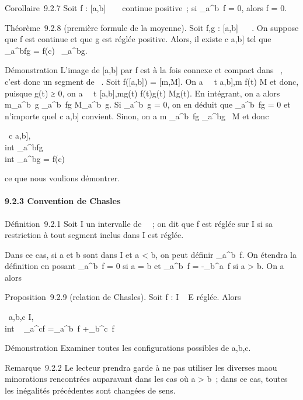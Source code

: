 \documentclass[]{article}
\begin{document}
Corollaire~9.2.7 Soit f : {[}a,b{]} \rightarrow~ ~ continue positive~; si
\int  \_a^b~f = 0, alors f = 0.

Théorème~9.2.8 (première formule de la moyenne). Soit f,g : {[}a,b{]} \rightarrow~
~. On suppose que f est continue et que g est réglée positive. Alors, il
existe c \in {[}a,b{]} tel que \int ~
\_a^bfg = f(c)\int ~
\_a^bg.

Démonstration L'image de {[}a,b{]} par f est à la fois connexe et
compact dans ~, c'est donc un segment de ~. Soit f({[}a,b{]}) =
{[}m,M{]}. On a \forall~~t \in {[}a,b{]},m \leq f(t) \leq M et
donc, puisque g(t) ≥ 0, on a \forall~~t \in
{[}a,b{]},mg(t) \leq f(t)g(t) \leq Mg(t). En intégrant, on a alors
m\int  \_a^b~g
\leq\int  \_a^b~fg \leq
M\int  \_a^b~g. Si
\int  \_a^b~g = 0, on en déduit que
\int  \_a^b~fg = 0 et n'importe
quel c \in {[}a,b{]} convient. Sinon, on a m \leq
\int  \_a^b~fg \over
\int  \_a^bg~ \leq M et donc

\exists~c \in {[}a,b{]}, \\int
 \_a^bfg \over \\int
 \_a^bg = f(c)

ce que nous voulions démontrer.

\paragraph{9.2.3 Convention de Chasles}

Définition~9.2.1 Soit I un intervalle de ~~; on dit que f est réglée sur
I si sa restriction à tout segment inclus dans I est réglée.

Dans ce cas, si a et b sont dans I et a \textless{} b, on peut définir
\int  \_a^b~f. On étendra la
définition en posant \int  \_a^b~f
= 0 si a = b et \int  \_a^b~f =
-\int  \_b^a~f si a \textgreater{}
b. On a alors

Proposition~9.2.9 (relation de Chasles). Soit f : I \rightarrow~ E réglée. Alors

\forall~a,b,c \in I, \\int ~
\_a^cf =\int  \_a^b~f
+\int  \_b^c~f

Démonstration Examiner toutes les configurations possibles de a,b,c.

Remarque~9.2.2 Le lecteur prendra garde à ne pas utiliser les diverses
ma\jmathorations ou minorations rencontrées auparavant dans les cas où a
\textgreater{} b~; dans ce cas, toutes les inégalités précédentes sont
changées de sens.
\end{document}
